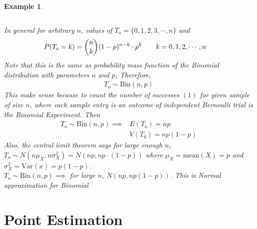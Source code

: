 \documentclass[11pt,oneside]{book}
\theoremstyle{newStyle}
\newtheorem{ex}{Example}[section]
\begin{document}
\begin{ex}
\begin{center}
\begin{tabular}{|l|l|l|l|l|l|}
\end{tabular}
  \end{center}
  In general for arbitrary $n$, values of $T_o=\{0,1,2,3,\cdots,n\}$ and \begin{align*}
  P(T_o=k)&=\binom nk (1-p)^{n-k}\cdot p^k\text{\qquad} k=0,1,2,\cdots,n
  \end{align*}
  Note that this is the same as probability mass function of the Binomial distribution with parameters $n$ and $p$, Therefore, \begin{align*}
  T_o\sim \text{Bin}(n,p)
  \end{align*}
  This make sense because to count the number of successes $(1)$ for given sample of size $n$, where each sample entry is an outcome of independent Bernoulli trial is the Binomial Experiment. Then \begin{align*}
  T_o\sim \text{Bin}(n,p)\implies &E(T_o)=np\\
  &V(T_0)=np(1-p)
  \end{align*}
  Also, the central limit theorem says for large enough $n$, $T_o\sim N(n\mu_X,n\sigma_X^2)=N(np,np\cdot (1-p))$ where $\mu_X=\text{mean}(X)=p$ and $\sigma_X^2=\text{Var}(x)=p(1-p)$.\\
 $T_o\sim \text{Bin}(n,p)\implies $ for large $n$, $N(np,np(1-p))$. This is Normal approximation for Binomial
 \end{ex}
\chapter[Point Estimation]{Point Estimation}
\end{document}
